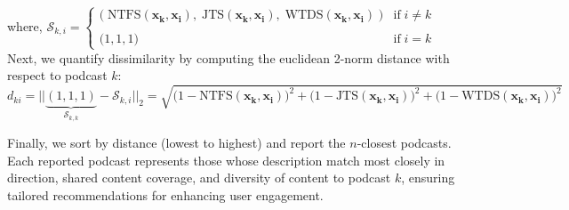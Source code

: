 \documentclass{article}
\begin{document}
\noindent where, $\mathcal{S}_{k,i} = \begin{cases}
\big( \; \text{NTFS}(\bm{x_k}, \bm{x_i}), \; \text{JTS}(\bm{x_k}, \bm{x_i}), \; \text{WTDS}(\bm{x_k}, \bm{x_i}) \;\big) & \text{if}\; i \neq k\\
\\
\big(1,1,1)                                                          & \text{if}\; i = k
\end{cases}$\\

\noindent Next, we quantify dissimilarity by computing the euclidean 2-norm distance with respect to podcast $k$:
$$d_{ki} = ||\underbrace{(1,1,1)}_{\mathcal{S}_{k,k}} - \mathcal{S}_{k,i}||_2 = \sqrt{\big(1 - \text{NTFS}(\bm{x_k}, \bm{x_i})\big)^2 + \big(1 - \text{JTS}(\bm{x_k}, \bm{x_i})\big)^2 + \big(1 - \text{WTDS}(\bm{x_k}, \bm{x_i})\big)^2}$$

\noindent Finally, we sort by distance (lowest to highest) and report the $n$-closest podcasts. Each reported podcast represents those whose description match most closely in direction, shared content coverage, and diversity of content to podcast $k$, ensuring tailored recommendations for enhancing user engagement.
\end{document}
